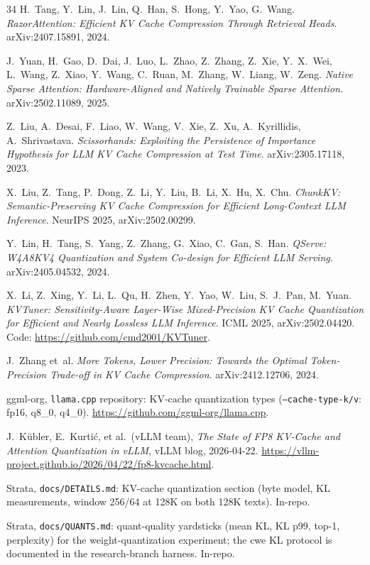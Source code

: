 \documentclass[10pt,twocolumn]{article}
\begin{document}
\begin{thebibliography}{34}
H.~Tang, Y.~Lin, J.~Lin, Q.~Han, S.~Hong, Y.~Yao, G.~Wang.
\emph{RazorAttention: Efficient KV Cache Compression Through Retrieval Heads}.
arXiv:2407.15891, 2024.

J.~Yuan, H.~Gao, D.~Dai, J.~Luo, L.~Zhao, Z.~Zhang, Z.~Xie, Y.~X.~Wei, L.~Wang, Z.~Xiao, Y.~Wang, C.~Ruan, M.~Zhang, W.~Liang, W.~Zeng.
\emph{Native Sparse Attention: Hardware-Aligned and Natively Trainable Sparse Attention}.
arXiv:2502.11089, 2025.

Z.~Liu, A.~Desai, F.~Liao, W.~Wang, V.~Xie, Z.~Xu, A.~Kyrillidis, A.~Shrivastava.
\emph{Scissorhands: Exploiting the Persistence of Importance Hypothesis for LLM KV Cache Compression at Test Time}.
arXiv:2305.17118, 2023.

X.~Liu, Z.~Tang, P.~Dong, Z.~Li, Y.~Liu, B.~Li, X.~Hu, X.~Chu.
\emph{ChunkKV: Semantic-Preserving KV Cache Compression for Efficient Long-Context LLM Inference}.
NeurIPS 2025, arXiv:2502.00299.

Y.~Lin, H.~Tang, S.~Yang, Z.~Zhang, G.~Xiao, C.~Gan, S.~Han.
\emph{QServe: W4A8KV4 Quantization and System Co-design for Efficient LLM Serving}.
arXiv:2405.04532, 2024.

X.~Li, Z.~Xing, Y.~Li, L.~Qu, H.~Zhen, Y.~Yao, W.~Liu, S.~J.~Pan, M.~Yuan.
\emph{KVTuner: Sensitivity-Aware Layer-Wise Mixed-Precision KV Cache Quantization for Efficient and Nearly Lossless LLM Inference}.
ICML 2025, arXiv:2502.04420. Code: \url{https://github.com/cmd2001/KVTuner}.

J.~Zhang et~al.
\emph{More Tokens, Lower Precision: Towards the Optimal Token-Precision Trade-off in KV Cache Compression}.
arXiv:2412.12706, 2024.

ggml-org, \texttt{llama.cpp} repository:
KV-cache quantization types (\texttt{--cache-type-k/v}: fp16, q8\_0, q4\_0).
\url{https://github.com/ggml-org/llama.cpp}.

J.~K{\"u}bler, E.~Kurti{\'c}, et al.\ (vLLM team), \emph{The State of FP8 KV-Cache and Attention Quantization in vLLM}, vLLM blog, 2026-04-22.
\url{https://vllm-project.github.io/2026/04/22/fp8-kvcache.html}.

Strata, \texttt{docs/DETAILS.md}: KV-cache quantization section (byte model, KL measurements, window 256/64 at 128K on both 128K texts). In-repo.

Strata, \texttt{docs/QUANTS.md}: quant-quality yardsticks (mean KL, KL p99, top-1, perplexity) for the weight-quantization experiment; the cwe KL protocol is documented in the research-branch harness. In-repo.


\end{thebibliography}
\end{document}
